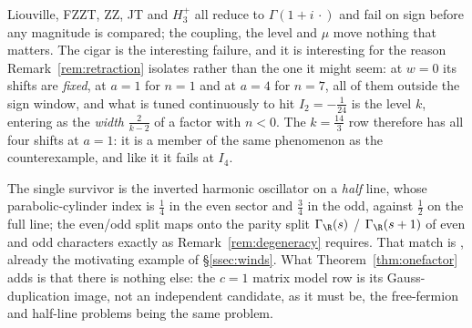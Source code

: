 Liouville, FZZT, ZZ, JT and $H_3^+$ all reduce to $\Gamma(1+i\,\cdot)$ and fail on
sign before any magnitude is compared; the coupling, the level and $\mu$ move
nothing that matters. The cigar is the interesting failure, and it is interesting
for the reason Remark~\ref{rem:retraction} isolates rather than the one it might
seem: at $w=0$ its shifts are \emph{fixed}, at $a=1$ for $n=1$ and at $a=4$ for
$n=7$, all of them outside the sign window, and what is tuned continuously to hit
$I_2=-\frac1{24}$ is the level $k$, entering as the \emph{width} $\frac2{k-2}$ of
a factor with $n<0$. The $k=\frac{14}3$ row therefore has all four shifts at
$a=1$: it is a member of the same phenomenon as the counterexample, and like it it
fails at $I_4$.

The single survivor is the inverted harmonic oscillator on a \emph{half} line,
whose parabolic-cylinder index is $\frac14$ in the even sector and $\frac34$ in
the odd, against $\frac12$ on the full line; the even/odd split maps onto the
parity split $\Gamma_\R(s)$ / $\Gamma_\R(s+1)$ of even and odd characters exactly
as Remark~\ref{rem:degeneracy} requires. That match is \cite{BhaduriKhareLaw},
already the motivating example of \S\ref{ssec:winds}. What
Theorem~\ref{thm:onefactor} adds is that there is nothing else: the $c=1$ matrix
model row is its Gauss-duplication image, not an independent candidate, as it must
be, the free-fermion and half-line problems being the same problem.


